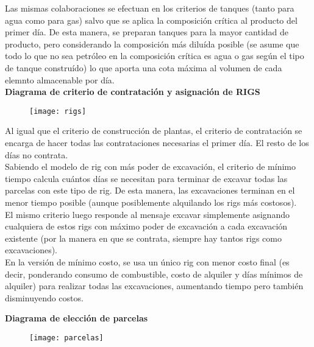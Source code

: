 Las mismas colaboraciones se efectuan en los criterios de tanques (tanto para agua como para gas) salvo que se aplica la composición crítica al producto del primer día. De esta manera, se preparan tanques para la mayor cantidad de producto, pero considerando la composición más diluída posible (se asume que todo lo que no sea petróleo en la composición crítica es agua o gas según el tipo de tanque construído) lo que aporta una cota máxima al volumen de cada elemnto almacenable por día. 
\\


\newpage
\textbf{Diagrama de criterio de contratación y asignación de RIGS}

\begin{figure}[H]
\centering
\texttt{[image: rigs]}
\end{figure}

Al igual que el criterio de construcción de plantas, el criterio de contratación se encarga de hacer todas las contrataciones necesarias el primer día. El resto de los días no contrata.
\\

Sabiendo el modelo de rig con más poder de excavación, el criterio de mínimo tiempo calcula cuántos días se necesitan para terminar de excavar todas las parcelas con este tipo de rig. De esta manera, las excavaciones terminan en el menor tiempo posible (aunque posiblemente alquilando los rigs más costosos).
\\

El mismo criterio luego responde al mensaje excavar simplemente asignando cualquiera de estos rigs con máximo poder de excavación a cada excavación existente (por la manera en que se contrata, siempre hay tantos rigs como excavaciones).
\\

En la versión de mínimo costo, se usa un único rig con menor costo final (es decir, ponderando consumo de combustible, costo de alquiler y días mínimos de alquiler) para realizar todas las excavaciones, aumentando tiempo pero también disminuyendo costos.


\newpage
\textbf{Diagrama de elección de parcelas}
\begin{figure}[H]
\texttt{[image: parcelas]}
\end{figure}

